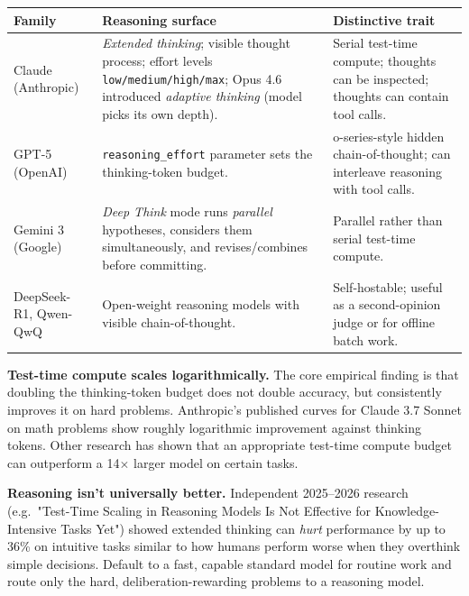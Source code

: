 \documentclass[a4paper,11pt]{article}
\begin{document}
\begin{center}\small
\begin{tabular}{p{3.5cm} p{4.5cm} p{4.8cm}}
  \toprule
  \textbf{Family} & \textbf{Reasoning surface} & \textbf{Distinctive trait} \\
  \midrule
  Claude (Anthropic) &
    \textit{Extended thinking}; visible thought process; effort levels
    \texttt{low/medium/high/max}; Opus 4.6 introduced \textit{adaptive
    thinking} (model picks its own depth). &
    Serial test-time compute; thoughts can be inspected; thoughts can
    contain tool calls. \\
  \addlinespace
  GPT-5 (OpenAI) &
    \texttt{reasoning\_effort} parameter sets the thinking-token
    budget. &
    o-series-style hidden chain-of-thought; can interleave reasoning
    with tool calls. \\
  \addlinespace
  Gemini 3 (Google) &
    \textit{Deep Think} mode runs \emph{parallel} hypotheses,
    considers them simultaneously, and revises/combines before
    committing. &
    Parallel rather than serial test-time compute. \\
  \addlinespace
  DeepSeek-R1, Qwen-QwQ &
    Open-weight reasoning models with visible chain-of-thought. &
    Self-hostable; useful as a second-opinion judge or for offline batch
    work. \\
  \bottomrule
\end{tabular}
\end{center}

\textbf{Test-time compute scales \textemdash{} logarithmically.} The
core empirical finding is that doubling the thinking-token budget
does not double accuracy, but consistently improves it on hard
problems. Anthropic's published curves for Claude 3.7 Sonnet on math
problems show roughly logarithmic improvement against thinking
tokens. Other research has shown that an appropriate test-time
compute budget can outperform a 14$\times$ larger model on certain
tasks.

\begin{ambercallout}
\textbf{Reasoning isn't universally better.}
Independent 2025–2026 research (e.g.\ "Test-Time Scaling in
Reasoning Models Is Not Effective for Knowledge-Intensive Tasks
Yet") showed extended thinking can \emph{hurt} performance by up to
36\% on intuitive tasks \textemdash{} similar to how humans perform
worse when they overthink simple decisions. Default to a fast,
capable standard model for routine work and route only the hard,
deliberation-rewarding problems to a reasoning model.
\end{ambercallout}
\end{document}
